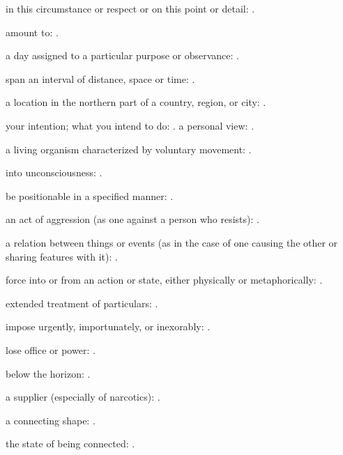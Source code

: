   in this circumstance or respect or on this point or detail: .

  amount to: .

  a day assigned to a particular purpose or observance: .

  span an interval of distance, space or time:   .

  a location in the northern part of a country, region, or city: .

  your intention; what you intend to do:   . a personal view: .

  a living organism characterized by voluntary movement:   .

  into unconsciousness: .

  be positionable in a specified manner: .

  an act of aggression (as one against a person who resists):   .

  a relation between things or events (as in the case of one causing the other or sharing features with it):   .

  force into or from an action or state, either physically or metaphorically:   .

  extended treatment of particulars: .

  impose urgently, importunately, or inexorably:   .

  lose office or power: .

  below the horizon: .

  a supplier (especially of narcotics): .

  a connecting shape:   .

  the state of being connected:   .

